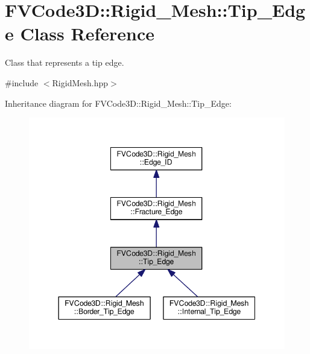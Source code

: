 \hypertarget{classFVCode3D_1_1Rigid__Mesh_1_1Tip__Edge}{}\section{F\+V\+Code3D\+:\+:Rigid\+\_\+\+Mesh\+:\+:Tip\+\_\+\+Edge Class Reference}
\label{classFVCode3D_1_1Rigid__Mesh_1_1Tip__Edge}


Class that represents a tip edge.  




{\ttfamily \#include $<$Rigid\+Mesh.\+hpp$>$}



Inheritance diagram for F\+V\+Code3D\+:\+:Rigid\+\_\+\+Mesh\+:\+:Tip\+\_\+\+Edge\+:
\nopagebreak
\begin{figure}[H]
\begin{center}
\leavevmode
\includegraphics[width=344pt]{classFVCode3D_1_1Rigid__Mesh_1_1Tip__Edge__inherit__graph}
\end{center}
\end{figure}


